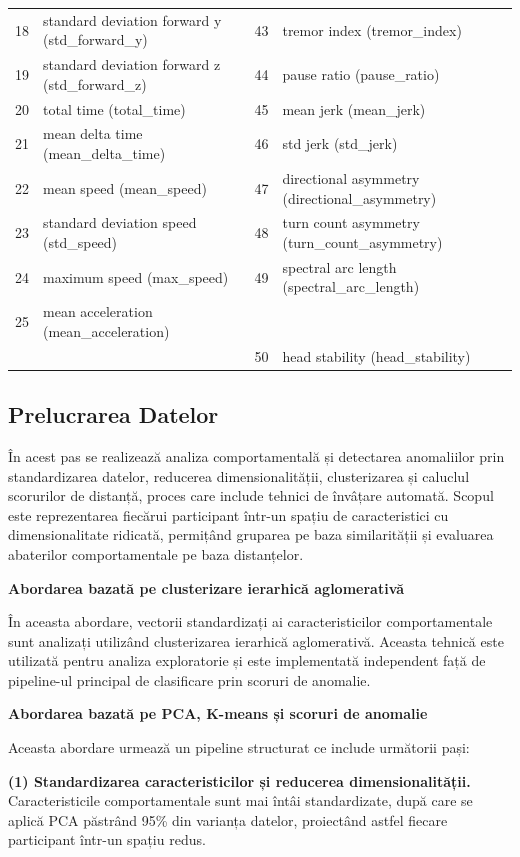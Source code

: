 \documentclass[12pt,a4paper]{report}
\theoremstyle{definition}
\theoremstyle{remark}
\begin{document}
\begin{table}[H]
{\begin{tabular}{|c|l|c|l|}
18 & standard deviation forward y (std\_forward\_y) & 43 & tremor index (tremor\_index) \\
19 & standard deviation forward z (std\_forward\_z) & 44 & pause ratio (pause\_ratio) \\
20 & total time (total\_time) & 45 & mean jerk (mean\_jerk) \\
21 & mean delta time (mean\_delta\_time) & 46 & std jerk (std\_jerk) \\
22 & mean speed (mean\_speed) & 47 & directional asymmetry (directional\_asymmetry) \\
23 & standard deviation speed (std\_speed) & 48 & turn count asymmetry (turn\_count\_asymmetry) \\
24 & maximum speed (max\_speed) & 49 & spectral arc length (spectral\_arc\_length) \\
25 & mean acceleration (mean\_acceleration) & & \\
& & 50 & head stability (head\_stability) \\
\hline
\end{tabular}
}
\end{table}

\subsection{Prelucrarea Datelor}

În acest pas se realizează analiza comportamentală și detectarea anomaliilor prin standardizarea datelor, reducerea dimensionalității, clusterizarea și caluclul scorurilor de distanță, proces care include tehnici de învâțare automată. Scopul este reprezentarea fiecărui participant într-un spațiu de caracteristici cu dimensionalitate ridicată, permițând gruparea pe baza similarității și evaluarea abaterilor comportamentale pe baza distanțelor.

\textbf{Abordarea bazată pe clusterizare ierarhică aglomerativă}

În aceasta abordare, vectorii standardizați ai caracteristicilor comportamentale sunt analizați utilizând clusterizarea ierarhică aglomerativă. Aceasta tehnică este utilizată pentru analiza exploratorie și este implementată independent față de pipeline-ul principal de clasificare prin scoruri de anomalie.

\textbf{Abordarea bazată pe PCA, K-means și scoruri de anomalie}

Aceasta abordare urmează un pipeline structurat ce include următorii pași:

\textbf{(1) Standardizarea caracteristicilor și reducerea dimensionalității.} Caracteristicile comportamentale sunt mai întâi standardizate, după care se aplică PCA păstrând 95\% din varianța datelor, proiectând astfel fiecare participant într-un spațiu redus. 
\end{document}
